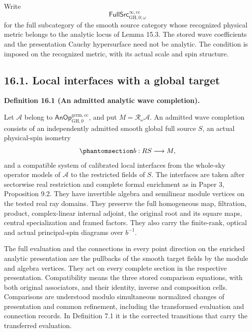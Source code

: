 \documentclass[
  english,
  11pt,
  reqno]{amsart}
\makeatletter
\newcommand{\paperdisplaynext}{%
  \let\paper@savedstartsection\@startsection
  \def\@startsection##1##2##3##4##5##6{%
    \let\@startsection\paper@savedstartsection
    \@tempskipa ##5\relax
    \ifdim\@tempskipa<\z@
      \def\paper@afterskip{.35\baselineskip}%
    \else
      \def\paper@afterskip{##5}%
    \fi
    \@startsection{##1}{##2}{##3}{##4}{\paper@afterskip}{##6}}}
\newcommand{\paperdisplaysection}{\paperdisplaynext\subsection}
\newcommand{\pandocstatementheading}[1]{%
  \par\if@nobreak\else
    \addpenalty{\@beginparpenalty}%
    \addvspace{.5\baselineskip plus .2\baselineskip minus .2\baselineskip}%
  \fi
  {\normalfont\bfseries #1\par}%
  \nobreak\@afterindenttrue\@afterheading
}
\makeatother
\begin{document}
Write \[
\mathsf{FullSrc}^{\infty,\mathrm{cc}}_{\mathrm{GH},0;\omega}
\] for the full subcategory of the smooth source category whose
recognized physical metric belongs to the analytic locus of Lemma 15.3.
The stored wave coefficients and the presentation Cauchy hypersurface
need not be analytic. The condition is imposed on the recognized metric,
with its actual scale and spin structure.

\protect{}\label{sec:analytic-wave-completion-data}
\paperdisplaysection{16.1. Local interfaces with a global
target}\label{local-interfaces-with-a-global-target}
\pandocstatementheading{\protect{}\label{def:analytic-admitted-wave-completion}Definition 16.1 (An admitted analytic wave completion).}

Let \(\mathcal A\) belong to
\(\mathsf{AnOp}^{\mathrm{germ},\mathrm{cc}}_{\mathrm{GH},0}\), and put
\(M=\mathcal R_\omega\mathcal A\). An admitted wave completion consists
of an independently admitted smooth global full source \(S\), an actual
physical-spin isometry
\begin{equation}\protect\phantomsection\label{eq:analytic-wave-completion-marking}{
b:RS\longrightarrow M,
}\end{equation} and a compatible system of calibrated local interfaces
from the whole-sky operator models of \(\mathcal A\) to the restricted
fields of \(S\). The interfaces are taken after sectorwise real
restriction and complete formal enrichment as in Paper 3, Proposition
9.2. They have invertible algebra and semilinear module vertices on the
tested real ray domains. They preserve the full homogeneous map,
filtration, product, complex-linear internal adjoint, the original root
and its square maps, central specialization and framed factors. They
also carry the finite-rank, optical and actual principal-spin diagrams
over \(b^{-1}\).

The full evaluation and the connections in every point direction on the
enriched analytic presentation are the pullbacks of the smooth target
fields by the module and algebra vertices. They act on every complete
section in the respective presentation. Compatibility means the three
stored comparison equations, with both original associators, and their
identity, inverse and composition cells. Comparisons are understood
modulo simultaneous normalized changes of presentation and common
refinement, including the transformed evaluation and connection records.
In Definition 7.1 it is the corrected transitions that carry the
transferred evaluation.
\end{document}
